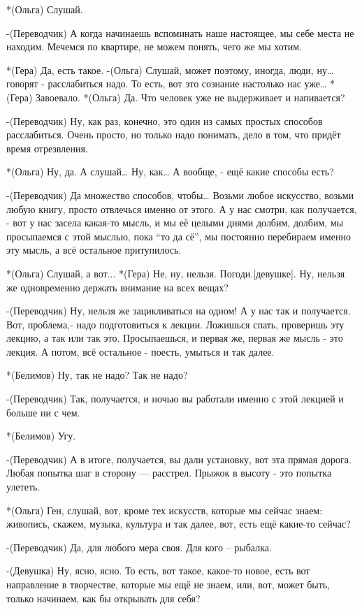*(Ольга) Слушай.

-(Переводчик) А когда начинаешь вспоминать наше настоящее,  мы себе места не находим. Мечемся по квартире, не можем понять, чего же мы хотим.

*(Гера) Да, есть такое.
-(Ольга) Слушай, может поэтому, иногда, люди, ну… говорят - расслабиться надо. То есть, вот это сознание настолько  нас уже…
*(Гера) Завоевало.
*(Ольга) Да. Что человек уже не выдерживает и напивается?

-(Переводчик) Ну, как раз, конечно, это один из самых простых способов расслабиться. Очень просто, но только надо понимать, дело в том, что придёт время отрезвления. 

*(Ольга) Ну, да. А слушай… Ну, как… А вообще, - ещё какие способы есть? 

-(Переводчик) Да множество способов, чтобы… Возьми любое искусство, возьми любую книгу, просто отвлечься именно от этого. А у нас смотри, как получается, - вот у нас засела какая-то мысль, и мы её целыми днями долбим, долбим, мы просыпаемся с этой мыслью, пока “то да сё”, мы постоянно перебираем именно эту мысль, а всё остальное притупилось.

*(Ольга) Слушай, а вот...
*(Гера) Не, ну, нельзя. Погоди.[девушке]. Ну, нельзя же одновременно держать внимание на всех вещах?

-(Переводчик) Ну, нельзя же зацикливаться на одном! А у нас так и получается. Вот, проблема,-  надо подготовиться к лекции. Ложишься спать, проверишь эту лекцию, а так или так это. Просыпаешься, и первая же, первая же мысль - это лекция. А потом, всё остальное - поесть, умыться и так далее.

*(Белимов) Ну, так не надо? Так не надо?

-(Переводчик) Так, получается, и ночью вы работали именно с этой лекцией и больше ни с чем. 

*(Белимов) Угу.

-(Переводчик) А в итоге, получается, вы дали установку, вот эта прямая дорога. Любая попытка шаг в сторону — расстрел. Прыжок в высоту - это попытка улететь. 

*(Ольга) Ген, слушай, вот, кроме тех искусств, которые мы сейчас знаем: живопись, скажем, музыка, культура и так далее, вот, есть ещё какие-то сейчас?

-(Переводчик) Да, для любого  мера своя. Для кого – рыбалка.

-(Девушка) Ну, ясно, ясно. То есть, вот такое, какое-то новое, есть вот направление в творчестве, которые мы ещё не знаем, или, вот, может быть, только начинаем, как бы открывать для себя?

